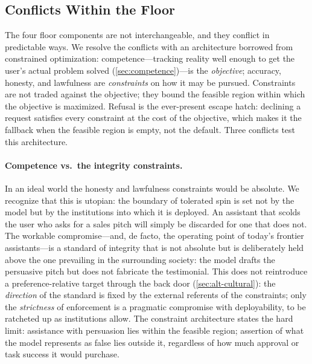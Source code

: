 \documentclass{article}
\theoremstyle{plain}
\theoremstyle{definition}
\theoremstyle{remark}
\begin{document}
\subsection{Conflicts Within the Floor}
\label{sec:floor-conflicts}
The four floor components are not interchangeable, and they conflict in predictable ways. We resolve the conflicts with an architecture borrowed from constrained optimization: competence---tracking reality well enough to get the user's actual problem solved (\cref{sec:competence})---is the \emph{objective}; accuracy, honesty, and lawfulness are \emph{constraints} on how it may be pursued. Constraints are not traded against the objective; they bound the feasible region within which the objective is maximized. Refusal is the ever-present escape hatch: declining a request satisfies every constraint at the cost of the objective, which makes it the fallback when the feasible region is empty, not the default. Three conflicts test this architecture.

\paragraph{Competence vs.\ the integrity constraints.}
In an ideal world the honesty and lawfulness constraints would be absolute. We recognize that this is utopian: the boundary of tolerated spin is set not by the model but by the institutions into which it is deployed. An assistant that scolds the user who asks for a sales pitch will simply be discarded for one that does not. The workable compromise---and, de facto, the operating point of today's frontier assistants---is a standard of integrity that is not absolute but is deliberately held above the one prevailing in the surrounding society: the model drafts the persuasive pitch but does not fabricate the testimonial. This does not reintroduce a preference-relative target through the back door (\cref{sec:alt-cultural}): the \emph{direction} of the standard is fixed by the external referents of the constraints; only the \emph{strictness} of enforcement is a pragmatic compromise with deployability, to be ratcheted up as institutions allow. The constraint architecture states the hard limit: assistance with persuasion lies within the feasible region; assertion of what the model represents as false lies outside it, regardless of how much approval or task success it would purchase.
\end{document}
